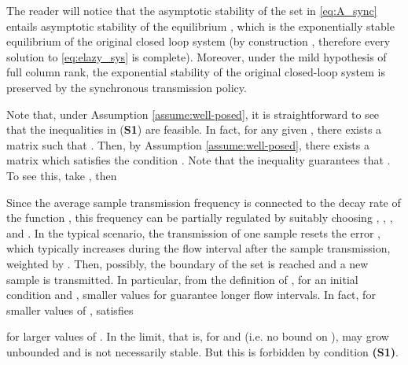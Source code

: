 \documentclass[twocolumn]{autart}
\begin{document}
{
The reader will notice that the asymptotic stability of the set 
 in \eqref{eq:A_sync} entails asymptotic stability
of the equilibrium , which is the exponentially stable 
equilibrium of the original closed loop system
(by construction , therefore every solution
to \eqref{eq:elazy_sys} is complete).
Moreover, under the mild hypothesis of  full column rank,
the exponential stability of the original closed-loop system
is preserved by the synchronous transmission policy.

Note that, under Assumption \ref{assume:well-posed}, 
it is straightforward to see that 
the inequalities in (\textbf{S1}) are feasible. In fact, 
for any given , 
there exists a matrix  such that
. Then, by
Assumption \ref{assume:well-posed}, there exists a matrix 
 which satisfies the condition 
.
Note that the inequality  guarantees that
. To see this, take , then


Since the average sample transmission frequency is connected to the 
decay rate of the function , this frequency can be partially regulated 
by suitably choosing , , , and . In the typical 
scenario, the transmission of one sample resets the error , which
typically increases during the flow interval after the sample transmission,  
weighted by . Then, possibly, the boundary of 
the set  is reached and a new sample is transmitted.
In particular, from the definition of , for 
an initial condition  and , smaller values for  
guarantee longer flow intervals. In fact, for 
smaller values of ,  satisfies 

for larger values of . In the limit, that is, for  
and  (i.e. no bound on ),
 may grow unbounded and  is not necessarily stable. But 
this is forbidden by condition \textbf{(S1)}.
}
\end{document}
